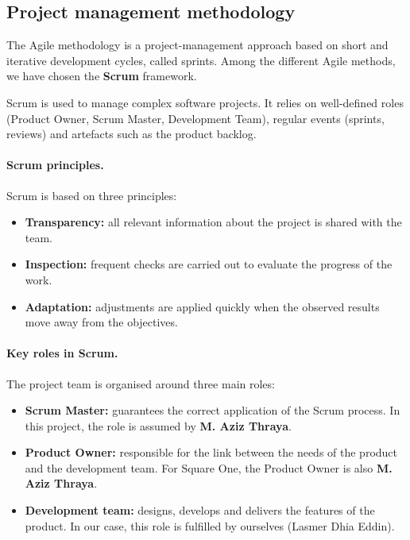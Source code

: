 \documentclass[12pt,a4paper,oneside]{report}
\newcommand{\StudentName}{Lasmer Dhia Eddin}
\begin{document}
\subsection{Project management methodology}
The Agile methodology is a project-management approach based on short and iterative development cycles, called sprints. Among the different Agile methods, we have chosen the \textbf{Scrum} framework.

Scrum is used to manage complex software projects. It relies on well-defined roles (Product Owner, Scrum Master, Development Team), regular events (sprints, reviews) and artefacts such as the product backlog.

\paragraph{Scrum principles.}
Scrum is based on three principles:
\begin{itemize}[leftmargin=1.4em,itemsep=0.35em]
  \item \textbf{Transparency:} all relevant information about the project is shared with the team.
  \item \textbf{Inspection:} frequent checks are carried out to evaluate the progress of the work.
  \item \textbf{Adaptation:} adjustments are applied quickly when the observed results move away from the objectives.
\end{itemize}

\paragraph{Key roles in Scrum.}
The project team is organised around three main roles:
\begin{itemize}[leftmargin=1.4em,itemsep=0.35em]
  \item \textbf{Scrum Master:} guarantees the correct application of the Scrum process. In this project, the role is assumed by \textbf{M. Aziz Thraya}.
  \item \textbf{Product Owner:} responsible for the link between the needs of the product and the development team. For Square One, the Product Owner is also \textbf{M. Aziz Thraya}.
  \item \textbf{Development team:} designs, develops and delivers the features of the product. In our case, this role is fulfilled by ourselves (\StudentName).
\end{itemize}
\end{document}
